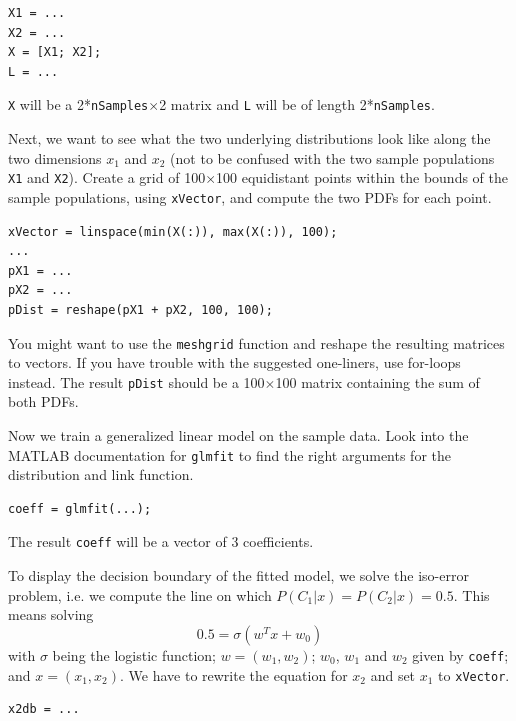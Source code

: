 \documentclass[10pt,a4paper,notitlepage]{report}
\begin{document}
\begin{verbatim}
X1 = ...
X2 = ...
X = [X1; X2];
L = ...
\end{verbatim}

\texttt{X} will be a 2*\texttt{nSamples}$\times$2 matrix and \texttt{L} will be of length 2*\texttt{nSamples}.

Next, we want to see what the two underlying distributions look like along the two dimensions $x_1$ and $x_2$ (not to be confused with the two sample populations \texttt{X1} and \texttt{X2}). Create a grid of 100$\times$100 equidistant points within the bounds of the sample populations, using \texttt{xVector}, and compute the two PDFs for each point.

\begin{verbatim}
xVector = linspace(min(X(:)), max(X(:)), 100);
...
pX1 = ...
pX2 = ...
pDist = reshape(pX1 + pX2, 100, 100);
\end{verbatim}

You might want to use the \texttt{meshgrid} function and reshape the resulting matrices to vectors. If you have trouble with the suggested one-liners, use for-loops instead. The result \texttt{pDist} should be a 100$\times$100 matrix containing the sum of both PDFs.

Now we train a generalized linear model on the sample data. Look into the MATLAB documentation for \texttt{glmfit} to find the right arguments for the distribution and link function.

\begin{verbatim}
coeff = glmfit(...);
\end{verbatim}

The result \texttt{coeff} will be a vector of 3 coefficients.

To display the decision boundary of the fitted model, we solve the iso-error problem, i.e. we compute the line on which $P(C_1|x) = P(C_2|x) = 0.5$. This means solving
\begin{equation*}
0.5 = \sigma (w^Tx+w_0)
\end{equation*}
with $\sigma$ being the logistic function; $w=(w_1,w_2)$; $w_0$, $w_1$ and $w_2$ given by \texttt{coeff}; and $x=(x_1,x_2)$. We have to rewrite the equation for $x_2$ and set $x_1$ to \texttt{xVector}.

\begin{verbatim}
x2db = ...
\end{verbatim}
\end{document}
